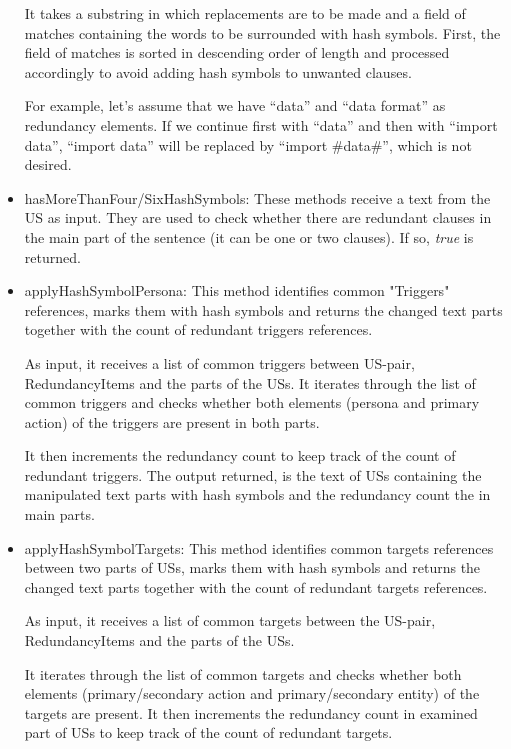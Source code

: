 \begin{itemize}
	It takes a substring in which replacements are to be made and a field of matches containing the words to be surrounded with hash symbols. First, the field of matches is sorted in descending order of length and processed accordingly to avoid adding hash symbols to unwanted clauses. 
	\begin{example}
		For example, let's assume that we have \enquote{data} and \enquote{data format} as redundancy elements. If we continue first with \enquote{data} and then with \enquote{import data}, \enquote{import data} will be replaced by \enquote{import \#data\#}, which is not desired.
	\end{example}
	\item hasMoreThanFour/SixHashSymbols: These methods receive a text from the US as input. They are used to check whether there are redundant clauses in the main part of the sentence (it can be one or two clauses). If so, \textit{true} is returned.
	
	\item applyHashSymbolPersona: This method identifies common "Triggers" references, marks them with hash symbols and returns the changed text parts together with the count of redundant triggers references. 
	
	As input, it receives a list of common triggers between US-pair, RedundancyItems and the parts of the USs. It iterates through the list of common triggers and checks whether both elements (persona and primary action) of the triggers are present in both parts. 
	
	It then increments the redundancy count to keep track of the count of redundant triggers. The output returned, is the text of USs containing the manipulated text parts with hash symbols and the redundancy count the in main parts.
	
	\item applyHashSymbolTargets: This method identifies common targets references between two parts of USs, marks them with hash symbols and returns the changed text parts together with the count of redundant targets references.
	
	As input, it receives a list of common targets between the US-pair, RedundancyItems and the parts of the USs. 
	
	It iterates through the list of common targets and checks whether both elements (primary/secondary action and primary/secondary entity) of the targets are present. It then increments the redundancy count in examined part of USs to keep track of the count of redundant targets. 
	

\end{itemize}
